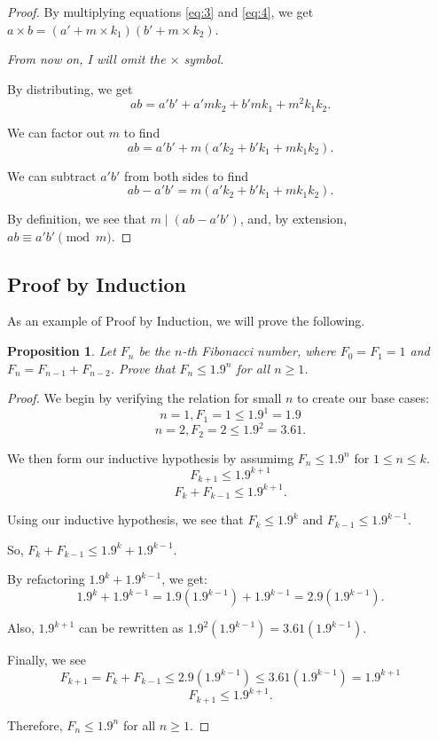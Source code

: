 \documentclass{article}
\newtheorem{proposition}{Proposition}
\theoremstyle{definition}
\begin{document}
\begin{enumerate}
{\begin{proof}
            By multiplying equations \ref{eq:3} and \ref{eq:4}, we get 
            \(a \times b = (a' + m\times k_1) (b' + m\times k_2)\).

            \textit{From now on, I will omit the \(\times\) symbol.}

            By distributing, we get 
            \[ab = a'b' + a'mk_2 + b'mk_1 + m^2k_1k_2.\]
            
            We can factor out \(m\) to find 
            \[ab = a'b' + m(a'k_2 + b'k_1 + mk_1k_2).\]

            We can subtract \(a'b'\) from both sides to find 
            \[ab - a'b' = m(a'k_2 + b'k_1 + mk_1k_2).\]

            By definition, we see that \(m \mid (ab - a'b')\), and, by extension, 
            \(ab \equiv a'b' \pmod{m}\).
                
        \end{proof}
    }
\end{enumerate}

\subsection{Proof by Induction}
As an example of Proof by Induction, we will prove the following.

\begin{proposition}
    Let \(F_n\) be the \(n\)-th Fibonacci number, where \(F_0 = F_1 = 1\)
    and \(F_n = F_{n-1} + F_{n-2}\). Prove that \(F_n \le 1.9^n\) for all
    \(n \ge 1\).
\end{proposition}
\begin{proof}
    We begin by verifying the relation for small \(n\) to create our 
    base cases:
    \[n = 1, F_1 = 1 \le 1.9^1 = 1.9\]
    \[n = 2, F_2 = 2 \le 1.9^2 = 3.61.\]

    We then form our inductive hypothesis by assumimg \(F_n \le 1.9^n\) for \(1 \le n \le k\).
    \[F_{k+1} \le 1.9^{k+1}\]
    \[F_k + F_{k-1} \le 1.9^{k+1}.\]

    Using our inductive hypothesis, we see that \(F_k \le 1.9^k\)
    and \(F_{k-1} \le 1.9^{k-1}\).

    So, \(F_k + F_{k-1} \le 1.9^k + 1.9^{k-1}\).

    By refactoring \(1.9^k + 1.9^{k-1}\), we get:
    \[1.9^k + 1.9^{k-1} = 1.9(1.9^{k-1}) + 1.9^{k-1} = 2.9(1.9^{k-1}).\]

    Also, \(1.9^{k+1}\) can be rewritten as \(1.9^2 (1.9^{k-1}) = 3.61(1.9^{k-1})\).

    Finally, we see
    \[F_{k+1} = F_k + F_{k-1} \le 2.9(1.9^{k-1}) \le 3.61(1.9^{k-1}) = 1.9^{k+1}\]
    \[F_{k+1} \le 1.9^{k+1}.\]

    Therefore, \(F_n \le 1.9^n\) for all \(n \ge 1\).
\end{proof}
\end{document}
